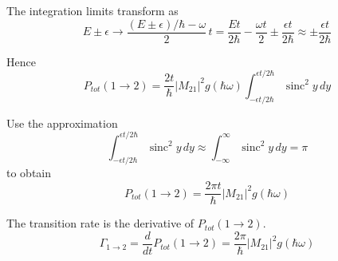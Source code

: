 \documentclass[12pt]{article}
\begin{document}
The integration limits transform as
\begin{equation*}
E\pm\epsilon
\rightarrow
\frac{(E\pm\epsilon)/\hbar-\omega}{2}\,t
=\frac{Et}{2\hbar}-\frac{\omega t}{2}
\pm\frac{\epsilon t}{2\hbar}
\approx
\pm\frac{\epsilon t}{2\hbar}
\end{equation*}

Hence
\begin{equation*}
P_{tot}(1\rightarrow2)=\frac{2t}{\hbar}|M_{21}|^2g(\hbar\omega)
\int_{-\epsilon t/2\hbar}^{\epsilon t/2\hbar}
\operatorname{sinc}^2y\,dy
\end{equation*}

Use the approximation
\begin{equation*}
\int_{-\epsilon t/2\hbar}^{\epsilon t/2\hbar}\operatorname{sinc}^2 y\,dy
\approx
\int_{-\infty}^\infty\operatorname{sinc}^2 y\,dy=\pi
\end{equation*}
%
to obtain
\begin{equation*}
P_{tot}(1\rightarrow2)=\frac{2\pi t}{\hbar}|M_{21}|^2g(\hbar\omega)
\end{equation*}

The transition rate is the derivative of $P_{tot}(1\rightarrow2)$.
\begin{equation*}
\Gamma_{1\rightarrow2}
=\frac{d}{dt}P_{tot}(1\rightarrow2)=\frac{2\pi}{\hbar}|M_{21}|^2g(\hbar\omega)
\end{equation*}
\end{document}
